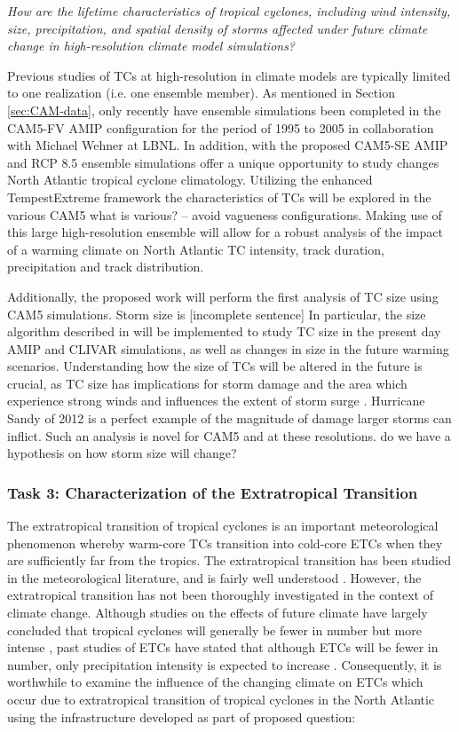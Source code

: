 \documentclass[11pt]{article}
\begin{document}
\emph{How are the lifetime characteristics of tropical cyclones, including wind intensity, size, precipitation, and spatial density of storms affected under future climate change in high-resolution climate model simulations?}

Previous studies of TCs at high-resolution in climate models are typically limited to one realization (i.e. one ensemble member). As mentioned in Section \ref{sec:CAM-data}, only recently have ensemble simulations been completed in the CAM5-FV AMIP configuration for the period of 1995 to 2005 in collaboration with Michael Wehner at LBNL. In addition, with the proposed CAM5-SE AMIP and RCP 8.5 ensemble simulations offer a unique opportunity to study changes North Atlantic tropical cyclone climatology. Utilizing the enhanced TempestExtreme framework the characteristics of TCs will be explored in the various CAM5 {\color{red} what is various? -- avoid vagueness} configurations. Making use of this large high-resolution ensemble will allow for a robust analysis of the impact of a warming climate on North Atlantic TC intensity, track duration, precipitation and track distribution. 

Additionally, the proposed work will perform the first analysis of TC size using CAM5 simulations.  Storm size is {\color{red}[incomplete sentence]}   In particular, the size algorithm described in \cite{Chavas2014} will be implemented to study TC size in the present day AMIP and CLIVAR simulations, as well as changes in size in the future warming scenarios. Understanding how the size of TCs will be altered in the future is crucial, as TC size has implications for storm damage and the area which experience strong winds and influences the extent of storm surge \citep{Powell2007}. Hurricane Sandy of 2012 is a perfect example of the magnitude of damage larger storms can inflict. Such an analysis is novel for CAM5 and at these resolutions. {\color{red} do we have a hypothesis on how storm size will change?}
 
\subsubsection{Task 3: Characterization of the Extratropical Transition}

The extratropical transition of tropical cyclones is an important meteorological phenomenon whereby warm-core TCs transition into cold-core ETCs when they are sufficiently far from the tropics.  The extratropical transition has been studied in the meteorological literature, and is fairly well understood \citep{hart2001climatology}.  However, the extratropical transition has not been thoroughly investigated in the context of climate change.  Although studies on the effects of future climate have largely concluded that tropical cyclones will generally be fewer in number but more intense \citep{Knutson2010}, past studies of ETCs have stated that although ETCs will be fewer in number, only precipitation intensity is expected to increase \citep{bengtsson2009will}.  Consequently, it is worthwhile to examine the influence of the changing climate on ETCs which occur due to extratropical transition of tropical cyclones in the North Atlantic using the infrastructure developed as part of proposed question:
\end{document}
